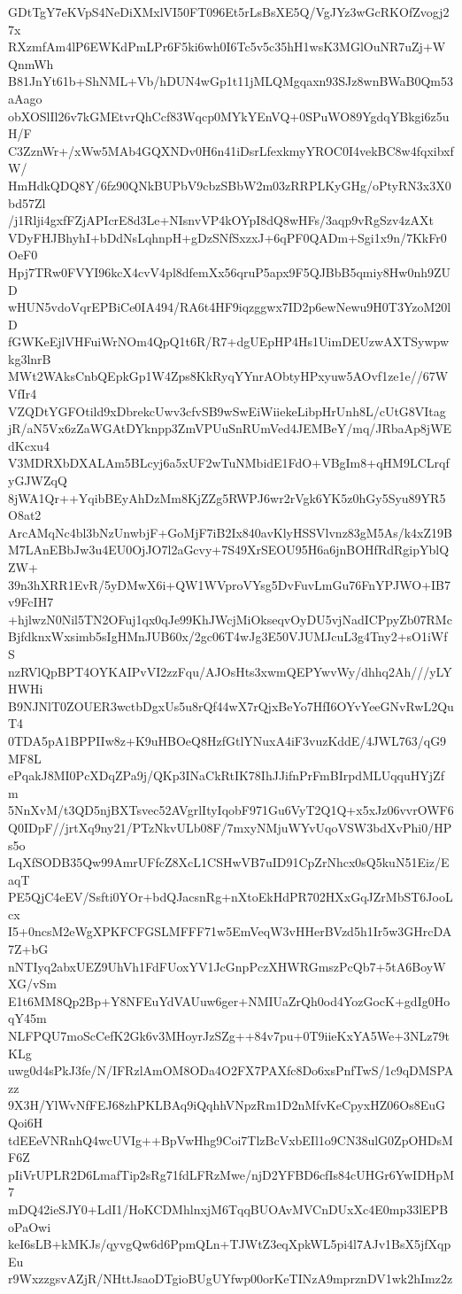 GDtTgY7eKVpS4NeDiXMxlVI50FT096Et5rLsBsXE5Q/VgJYz3wGcRKOfZvogj27x
RXzmfAm4lP6EWKdPmLPr6F5ki6wh0I6Tc5v5c35hH1wsK3MGlOuNR7uZj+WQnmWh
B81JnYt61b+ShNML+Vb/hDUN4wGp1t11jMLQMgqaxn93SJz8wnBWaB0Qm53aAago
obXOSlIl26v7kGMEtvrQhCcf83Wqcp0MYkYEnVQ+0SPuWO89YgdqYBkgi6z5uH/F
C3ZznWr+/xWw5MAb4GQXNDv0H6n41iDsrLfexkmyYROC0I4vekBC8w4fqxibxfW/
HmHdkQDQ8Y/6fz90QNkBUPbV9cbzSBbW2m03zRRPLKyGHg/oPtyRN3x3X0bd57Zl
/j1Rlji4gxfFZjAPIcrE8d3Le+NIsnvVP4kOYpI8dQ8wHFs/3aqp9vRgSzv4zAXt
VDyFHJBhyhI+bDdNsLqhnpH+gDzSNfSxzxJ+6qPF0QADm+Sgi1x9n/7KkFr0OeF0
Hpj7TRw0FVYI96kcX4cvV4pl8dfemXx56qruP5apx9F5QJBbB5qmiy8Hw0nh9ZUD
wHUN5vdoVqrEPBiCe0IA494/RA6t4HF9iqzggwx7ID2p6ewNewu9H0T3YzoM20lD
fGWKeEjlVHFuiWrNOm4QpQ1t6R/R7+dgUEpHP4Hs1UimDEUzwAXTSywpwkg3lnrB
MWt2WAksCnbQEpkGp1W4Zps8KkRyqYYnrAObtyHPxyuw5AOvf1ze1e//67WVfIr4
VZQDtYGFOtild9xDbrekcUwv3cfvSB9wSwEiWiiekeLibpHrUnh8L/cUtG8VItag
jR/aN5Vx6zZaWGAtDYknpp3ZmVPUuSnRUmVed4JEMBeY/mq/JRbaAp8jWEdKcxu4
V3MDRXbDXALAm5BLcyj6a5xUF2wTuNMbidE1FdO+VBgIm8+qHM9LCLrqfyGJWZqQ
8jWA1Qr++YqibBEyAhDzMm8KjZZg5RWPJ6wr2rVgk6YK5z0hGy5Syu89YR5O8at2
ArcAMqNc4bl3bNzUnwbjF+GoMjF7iB2Ix840avKlyHSSVlvnz83gM5As/k4xZ19B
M7LAnEBbJw3u4EU0OjJO7l2aGcvy+7S49XrSEOU95H6a6jnBOHfRdRgipYblQZW+
39n3hXRR1EvR/5yDMwX6i+QW1WVproVYsg5DvFuvLmGu76FnYPJWO+IB7v9FcIH7
+hjlwzN0Nil5TN2OFuj1qx0qJe99KhJWcjMiOkseqvOyDU5vjNadICPpyZb07RMc
BjfdknxWxsimb5sIgHMnJUB60x/2gc06T4wJg3E50VJUMJcuL3g4Tny2+sO1iWfS
nzRVlQpBPT4OYKAIPvVI2zzFqu/AJOsHts3xwmQEPYwvWy/dhhq2Ah///yLYHWHi
B9NJNlT0ZOUER3wctbDgxUs5u8rQf44wX7rQjxBeYo7HfI6OYvYeeGNvRwL2QuT4
0TDA5pA1BPPIIw8z+K9uHBOeQ8HzfGtlYNuxA4iF3vuzKddE/4JWL763/qG9MF8L
ePqakJ8MI0PcXDqZPa9j/QKp3INaCkRtIK78IhJJifnPrFmBIrpdMLUqquHYjZfm
5NnXvM/t3QD5njBXTsvec52AVgrlItyIqobF971Gu6VyT2Q1Q+x5xJz06vvrOWF6
Q0IDpF//jrtXq9ny21/PTzNkvULb08F/7mxyNMjuWYvUqoVSW3bdXvPhi0/HPs5o
LqXfSODB35Qw99AmrUFfcZ8XcL1CSHwVB7uID91CpZrNhcx0sQ5kuN51Eiz/EaqT
PE5QjC4eEV/Ssfti0YOr+bdQJacsnRg+nXtoEkHdPR702HXxGqJZrMbST6JooLcx
I5+0ncsM2eWgXPKFCFGSLMFFF71w5EmVeqW3vHHerBVzd5h1Ir5w3GHrcDA7Z+bG
nNTIyq2abxUEZ9UhVh1FdFUoxYV1JcGnpPczXHWRGmszPcQb7+5tA6BoyWXG/vSm
E1t6MM8Qp2Bp+Y8NFEuYdVAUuw6ger+NMIUaZrQh0od4YozGocK+gdIg0HoqY45m
NLFPQU7moScCefK2Gk6v3MHoyrJzSZg++84v7pu+0T9iieKxYA5We+3NLz79tKLg
uwg0d4sPkJ3fe/N/IFRzlAmOM8ODa4O2FX7PAXfc8Do6xsPnfTwS/1c9qDMSPAzz
9X3H/YlWvNfFEJ68zhPKLBAq9iQqhhVNpzRm1D2nMfvKeCpyxHZ06Os8EuGQoi6H
tdEEeVNRnhQ4wcUVIg++BpVwHhg9Coi7TlzBcVxbEIl1o9CN38ulG0ZpOHDsMF6Z
pIiVrUPLR2D6LmafTip2sRg71fdLFRzMwe/njD2YFBD6cfIs84cUHGr6YwIDHpM7
mDQ42ieSJY0+LdI1/HoKCDMhlnxjM6TqqBUOAvMVCnDUxXc4E0mp33lEPBoPaOwi
keI6sLB+kMKJs/qyvgQw6d6PpmQLn+TJWtZ3eqXpkWL5pi4l7AJv1BsX5jfXqpEu
r9WxzzgsvAZjR/NHttJsaoDTgioBUgUYfwp00orKeTINzA9mprznDV1wk2hImz2z
